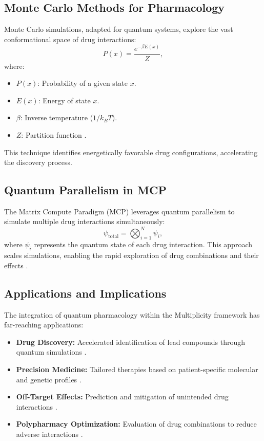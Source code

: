 \documentclass{article}
\theoremstyle{plain}
\begin{document}
\subsection{Monte Carlo Methods for Pharmacology}
Monte Carlo simulations, adapted for quantum systems, explore the vast conformational space of drug interactions:
\begin{equation}
P(x) = \frac{e^{-\beta E(x)}}{Z},
\end{equation}
where:
\begin{itemize}
    \item $P(x)$: Probability of a given state $x$.
    \item $E(x)$: Energy of state $x$.
    \item $\beta$: Inverse temperature ($1/k_BT$).
    \item $Z$: Partition function \cite{monteCarlo2023}.
\end{itemize}
This technique identifies energetically favorable drug configurations, accelerating the discovery process.

\subsection{Quantum Parallelism in MCP}
The Matrix Compute Paradigm (MCP) leverages quantum parallelism to simulate multiple drug interactions simultaneously:
\begin{equation}
\psi_{\text{total}} = \bigotimes_{i=1}^{N} \psi_i,
\end{equation}
where $\psi_i$ represents the quantum state of each drug interaction. This approach scales simulations, enabling the rapid exploration of drug combinations and their effects \cite{mcpQuantum2023}.

\subsection{Applications and Implications}
The integration of quantum pharmacology within the Multiplicity framework has far-reaching applications:
\begin{itemize}
    \item \textbf{Drug Discovery:} Accelerated identification of lead compounds through quantum simulations \cite{drugDiscovery2023}.
    \item \textbf{Precision Medicine:} Tailored therapies based on patient-specific molecular and genetic profiles \cite{precisionMedicine2022}.
    \item \textbf{Off-Target Effects:} Prediction and mitigation of unintended drug interactions \cite{offTarget2023}.
    \item \textbf{Polypharmacy Optimization:} Evaluation of drug combinations to reduce adverse interactions \cite{polypharmacy2023}.
\end{itemize}
\end{document}
